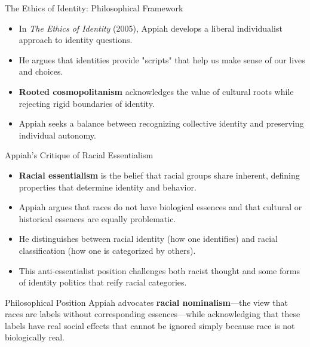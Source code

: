 \documentclass{beamer}
\begin{document}
	\begin{frame}{The Ethics of Identity: Philosophical Framework}
		\begin{itemize}
			\item In \textit{The Ethics of Identity} (2005), Appiah develops a liberal individualist approach to identity questions.
			\item He argues that identities provide "scripts" that help us make sense of our lives and choices.
			\item \textbf{Rooted cosmopolitanism} acknowledges the value of cultural roots while rejecting rigid boundaries of identity.
			\item Appiah seeks a balance between recognizing collective identity and preserving individual autonomy.
		\end{itemize}
		
		\begin{center}
		\end{center}
	\end{frame}
	
	\begin{frame}{Appiah's Critique of Racial Essentialism}
		\begin{itemize}
			\item \textbf{Racial essentialism} is the belief that racial groups share inherent, defining properties that determine identity and behavior.
			\item Appiah argues that races do not have biological essences and that cultural or historical essences are equally problematic.
			\item He distinguishes between racial identity (how one identifies) and racial classification (how one is categorized by others).
			\item This anti-essentialist position challenges both racist thought and some forms of identity politics that reify racial categories.
		\end{itemize}
		
		\begin{exampleblock}{Philosophical Position}
			Appiah advocates \textbf{racial nominalism}—the view that races are labels without corresponding essences—while acknowledging that these labels have real social effects that cannot be ignored simply because race is not biologically real.
		\end{exampleblock}
	\end{frame}
	
\end{document}
